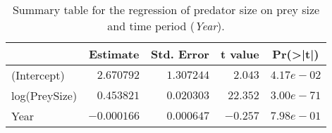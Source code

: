 \begin{table}[!htbp]
\caption{Summary table for the regression of predator size on prey size and 
  time period (\emph{Year}).\label{tab:SizeY}} 
\begin{center}
\begin{tabular}{lrrrr}
\hline
\multicolumn{1}{l}{}&\multicolumn{1}{c}{Estimate}&\multicolumn{1}{c}{Std. Error}&\multicolumn{1}{c}{t value}&\multicolumn{1}{c}{Pr(\textgreater |t|)}\tabularnewline
\hline
(Intercept)&$ 2.670792$&$1.307244$&$ 2.043$&$4.17e-02$\tabularnewline
log(PreySize)&$ 0.453821$&$0.020303$&$22.352$&$3.00e-71$\tabularnewline
Year&$-0.000166$&$0.000647$&$-0.257$&$7.98e-01$\tabularnewline
\hline
\end{tabular}\end{center}
\end{table}
